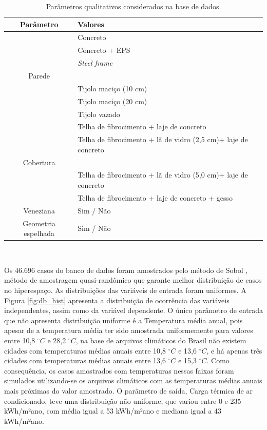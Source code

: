 \documentclass{article}
\begin{document}
\begin{table}[h!]
	\centering
	\caption{Parâmetros qualitativos considerados na base de dados.}
	\label{table:qualivars}
	\begin{tabular}{|c |l |}
		\hline
		\textbf{Parâmetro} & \textbf{Valores} \\
		\hline
		{} & Concreto \\
		{} & Concreto + EPS \\
		{} & \textit{Steel frame} \vspace{-6pt} \\
		Parede & {} \vspace{-6pt}\\
		{} & Tijolo maciço (10 cm) \\
		{} & Tijolo maciço (20 cm) \\
		{} & Tijolo vazado \\
		\hline
		{} & Telha de fibrocimento + laje de concreto \\
		{} & Telha de fibrocimento + lã de vidro (2,5 cm)+ laje de concreto \vspace{-6pt} \\
		Cobertura & {} \vspace{-6pt}\\
		{} & Telha de fibrocimento + lã de vidro (5,0 cm)+ laje de concreto \\
		{} & Telha de fibrocimento + laje de concreto + gesso\\
		\hline
		Veneziana & Sim / Não \\
		\hline
		Geometria espelhada & Sim / Não \\
		\hline 
	\end{tabular}\\
\end{table}

Os 46.696 casos do banco de dados foram amostrados pelo método de Sobol \citep{Sobol1993}, método de amostragem quasi-randômico que garante melhor distribuição de casos no hiperespaço. As distribuições das variáveis de entrada foram uniformes.
A Figura \ref{fig:db_hist} apresenta a distribuição de ocorrência das variáveis independentes, assim como da variável dependente.
O único parâmetro de entrada que não apresenta distribuição uniforme é a Temperatura média anual, pois apesar de a temperatura média ter sido amostrada uniformemente para valores entre 10,8 $^{\circ}C$ e 28,2 $^{\circ}C$, na base de arquivos climáticos do Brasil não existem cidades com temperaturas médias anuais entre 10,8 $^{\circ}C$ e 13,6 $^{\circ}C$, e há apenas três cidades com temperaturas médias anuais entre 13,6 $^{\circ}C$ e 15,3 $^{\circ}C$. 
Como consequência, os casos amostrados com temperaturas nessas faixas foram simulados utilizando-se os arquivos climáticos com as temperaturas médias anuais mais próximas do valor amostrado.
O parâmetro de saída, Carga térmica de ar condicionado, teve uma distribuição não uniforme, que variou entre 0 e 235 kWh/m²ano, com média igual a 53 kWh/m²ano e mediana igual a 43 kWh/m²ano. 
\end{document}
